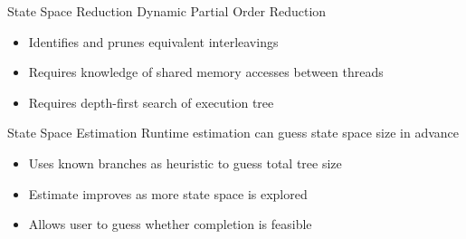 \documentclass[xcolor=dvipsnames]{beamer}
\begin{document}
\begin{frame}{State Space Reduction}
	Dynamic Partial Order Reduction
	\begin{itemize}
		\item Identifies and prunes equivalent interleavings
		\item Requires knowledge of shared memory accesses between threads
		\item Requires depth-first search of execution tree
	\end{itemize}


\end{frame}

\begin{frame}{State Space Estimation}
	Runtime estimation can guess state space size in advance
	\begin{itemize}
		\item Uses known branches as heuristic to guess total tree size
		\item Estimate improves as more state space is explored
		\item Allows user to guess whether completion is feasible
	\end{itemize}

\end{frame}

%
\end{document}
